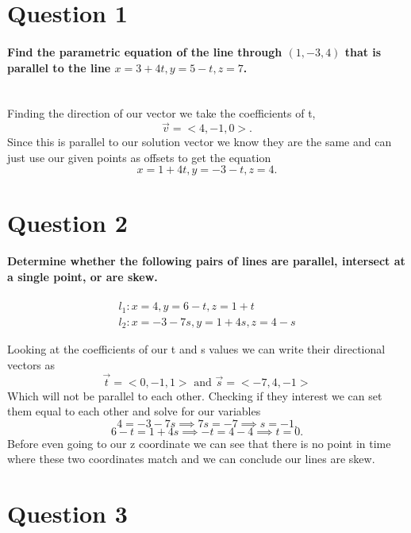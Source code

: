 \section{Question 1}%
\label{sec: Question 1 }
\paragraph{Find the parametric equation of the line through $ \left( 1,-3,4 \right)  $ that is parallel to the line $ x=3+4t, y=5-t, z=7 $. \\ \\}

Finding the direction of our vector we take the coefficients of t,
\[
\vec{ v }= < 4,-1,0 >
.\] 
Since this is parallel to our solution vector we know they are the same and can just use our given points as offsets to get the equation
\[
x=1+4t, y=-3-t, z=4
.\] 

\section{Question 2}%
\label{sec: Question 2 }
\paragraph{Determine whether the following pairs of lines are parallel, intersect at a single point, or are skew.}
\begin{gather*}
l_1: x=4, y=6 -t, z=1+t \\
l_2: x=-3-7s, y=1+4s,z=4-s
\end{gather*}

Looking at the coefficients of our t and s values we can write their directional vectors as
\[
\vec{ t }= < 0,-1,1 > \text{ and } \vec{ s }= < -7,4,-1 >
\] 
Which will not be parallel to each other. Checking if they interest we can set them equal to each other and solve for our variables
\[
4= -3-7s \implies 7s= -7 \implies s= -1
.\] 
\[
6-t= 1+4s \implies -t= 4-4 \implies t= 0
.\] 
Before even going to our z coordinate we can see that there is no point in time where these two coordinates match and we can conclude our lines are skew.

\section{Question 3}%
\label{sec: Question 3 }

